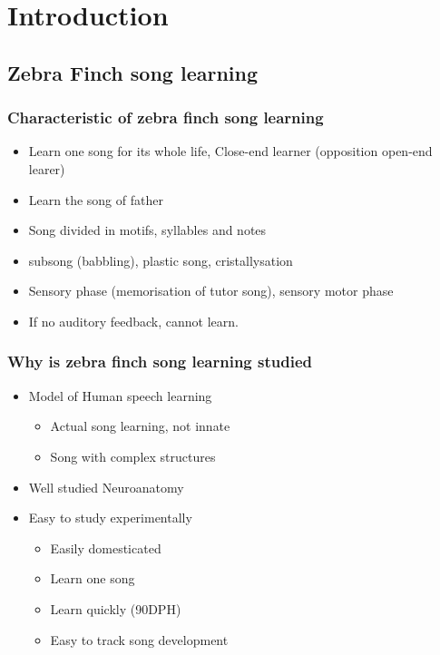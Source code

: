 \chapter{Introduction}\label{introduction}

\section{Zebra Finch song learning}\label{zebra-finch-song-learning}

\subsection{Characteristic of zebra finch song
learning}\label{characteristic-of-zebra-finch-song-learning}

\begin{itemize}
\tightlist
\item
  Learn one song for its whole life, Close-end learner (opposition
  open-end learer)
\item
  Learn the song of father
\item
  Song divided in motifs, syllables and notes
\item
  subsong (babbling), plastic song, cristallysation
\item
  Sensory phase (memorisation of tutor song), sensory motor phase
\item
  If no auditory feedback, cannot learn.
\end{itemize}

\subsection{Why is zebra finch song learning
studied}\label{why-is-zebra-finch-song-learning-studied}

\begin{itemize}
\tightlist
\item
  Model of Human speech learning

  \begin{itemize}
  \tightlist
  \item
    Actual song learning, not innate
  \item
    Song with complex structures
  \end{itemize}
\item
  Well studied Neuroanatomy
\item
  Easy to study experimentally

  \begin{itemize}
  \tightlist
  \item
    Easily domesticated
  \item
    Learn one song
  \item
    Learn quickly (90DPH)
  \item
    Easy to track song development
  \end{itemize}
\end{itemize}

